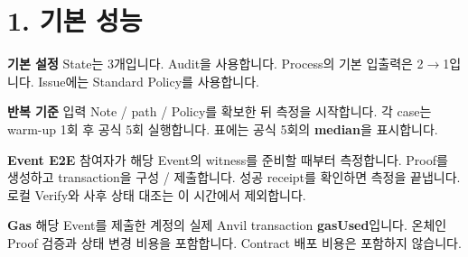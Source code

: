 \documentclass[11pt,a4paper]{article}
\begin{document}
\begin{landscape}
\end{landscape}
\section*{1. 기본 성능}
\textbf{기본 설정}\newline
State는 3개입니다.\newline
Audit을 사용합니다.\newline
Process의 기본 입출력은 2$\rightarrow$1입니다.\newline
Issue에는 Standard Policy를 사용합니다.\par\smallskip
\textbf{반복 기준}\newline
입력 Note / path / Policy를 확보한 뒤 측정을 시작합니다.\newline
각 case는 warm-up 1회 후 공식 5회 실행합니다.\newline
표에는 공식 5회의 \textbf{median}을 표시합니다.

\textbf{Event E2E}\newline
참여자가 해당 Event의 witness를 준비할 때부터 측정합니다.\newline
Proof를 생성하고 transaction을 구성 / 제출합니다.\newline
성공 receipt를 확인하면 측정을 끝냅니다.\newline
로컬 Verify와 사후 상태 대조는 이 시간에서 제외합니다.\par\smallskip
\textbf{Gas}\newline
해당 Event를 제출한 계정의 실제 Anvil transaction \textbf{gasUsed}입니다.\newline
온체인 Proof 검증과 상태 변경 비용을 포함합니다.\newline
Contract 배포 비용은 포함하지 않습니다.
\end{document}
